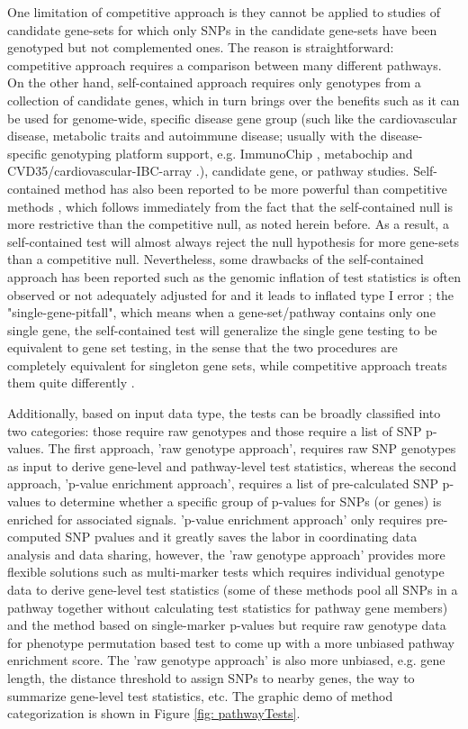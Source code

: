 \documentclass[12pt]{article}
\begin{document}
One limitation of competitive approach is they cannot be applied to studies of candidate gene-sets for
which only SNPs in the candidate gene-sets have been genotyped but not complemented ones. The reason is straightforward: competitive approach requires a comparison between many different pathways. On the other hand, self-contained approach requires only genotypes from a collection of candidate genes, which in turn brings over the benefits such as it can be used for genome-wide, specific disease gene group (such like the cardiovascular disease, metabolic traits and autoimmune disease; usually with the disease-specific genotyping platform support, e.g. ImmunoChip \cite{Cortes2011}, metabochip \cite{Voight2012} and CVD35/cardiovascular-IBC-array \cite{Cheng1999,Keating2008}.), candidate gene, or pathway studies. Self-contained method has also been reported to be more powerful than competitive methods \cite{Goeman2007}, which follows immediately from the fact that the self-contained null is more restrictive than the competitive null, as noted herein before. As a result, a self-contained test will almost always reject the null hypothesis for more gene-sets than a competitive null. Nevertheless, some drawbacks of the self-contained approach has been reported such as the genomic inflation of test statistics is often observed or not adequately adjusted for and it leads to inflated type I error \cite{wang2007pathway,Goeman2007,Fridley2010}; the "single-gene-pitfall", which means when a gene-set/pathway contains only one single gene, the self-contained test will generalize the single gene testing to be equivalent to gene set testing, in the sense that the two procedures are completely equivalent for singleton gene sets, while competitive approach treats them quite differently \cite{Goeman2007}. 

Additionally, based on input data type, the tests can be broadly classified into two categories: those require raw genotypes and those require a list of SNP p-values. The first approach, 'raw genotype approach', requires raw SNP genotypes as input to derive gene-level and pathway-level test statistics, whereas the second approach, 'p-value enrichment approach', requires a list of pre-calculated SNP p-values to determine whether a specific group of p-values for SNPs (or genes) is enriched for associated signals. 'p-value enrichment approach' only requires pre-computed SNP pvalues and it greatly saves the labor in coordinating data analysis and data sharing, however, the 'raw genotype approach' provides more flexible solutions such as multi-marker tests which requires individual genotype data to derive gene-level test statistics (some of these methods pool all SNPs in a pathway together without calculating test statistics for pathway gene members) and the method based on single-marker p-values but require raw genotype data for phenotype permutation based test to come up with a more unbiased pathway enrichment score. The 'raw genotype approach' is also more unbiased, e.g. gene length, the distance threshold to assign SNPs to nearby genes, the way to summarize gene-level test statistics, etc. The graphic demo of method categorization is shown in Figure \ref{fig: pathwayTests}.
\end{document}
